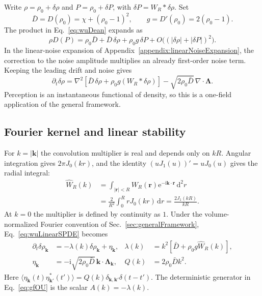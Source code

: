 \documentclass{article}
\begin{document}
Write $\rho=\rho_0+\delta\rho$ and $P=\rho_0+\delta P$, with $\delta P=W_R*\delta\rho$. Set
\begin{equation}
    \bar D=D(\rho_0)=\chi+(\rho_0-1)^2,
    \qquad g=D'(\rho_0)=2(\rho_0-1).
    \label{eq:wuLinearCoefficients}
\end{equation}
The product in Eq.~\eqref{eq:wuDean} expands as
\begin{equation}
    \rho D(P)=\rho_0\bar D+\bar D\,\delta\rho+\rho_0g\,\delta P
       +O\bigl((|\delta\rho|+|\delta P|)^2\bigr).
\end{equation}
In the linear-noise expansion of Appendix~\ref{appendix:linearNoiseExpansion}, the correction to the noise amplitude multiplies an already first-order noise term. Keeping the leading drift and noise gives
\begin{equation}
    \partial_t\delta\rho
    =\nabla^2[\bar D\,\delta\rho+\rho_0g(W_R*\delta\rho)]
       -\sqrt{2\rho_0\bar D}\,\nabla\cdot\boldsymbol\Lambda .
    \label{eq:wuLinearSPDE}
\end{equation}
Perception is an instantaneous functional of density, so this is a one-field application of the general framework.

\subsection{Fourier kernel and linear stability}

For $k=|\mathbf k|$ the convolution multiplier is real and depends only on $kR$. Angular integration gives $2\pi J_0(kr)$, and the identity $(uJ_1(u))'=uJ_0(u)$ gives the radial integral:
\begin{align}
    \widehat W_R(k)
    &=\int_{|\mathbf r|<R}W_R(\mathbf r)\mathrm e^{-\mathrm i\mathbf k\cdot\mathbf r}\,\mathrm d^2r\\
    &=\frac{2}{R^2}\int_0^R rJ_0(kr)\,\mathrm dr
      =\frac{2J_1(kR)}{kR}.
    \label{eq:wuFourierKernel}
\end{align}
At $k=0$ the multiplier is defined by continuity as $1$. Under the volume-normalized Fourier convention of Sec.~\ref{sec:generalFramework}, Eq.~\eqref{eq:wuLinearSPDE} becomes
\begin{align}
    \partial_t\delta\rho_{\mathbf k}&=-\lambda(k)\delta\rho_{\mathbf k}+\eta_{\mathbf k},
    & \lambda(k)&=k^2[\bar D+\rho_0g\widehat W_R(k)],\\
    \eta_{\mathbf k}&=-\mathrm i\sqrt{2\rho_0\bar D}\,\mathbf k\cdot\boldsymbol\Lambda_{\mathbf k},
    & Q(k)&=2\rho_0\bar D k^2.
    \label{eq:wuOU}
\end{align}
Here $\langle\eta_{\mathbf k}(t)\eta_{\mathbf k'}^*(t')\rangle
=Q(k)\delta_{\mathbf k,\mathbf k'}\delta(t-t')$. The deterministic generator in Eq.~\eqref{eq:gfOU} is the scalar $A(k)=-\lambda(k)$.
\end{document}
